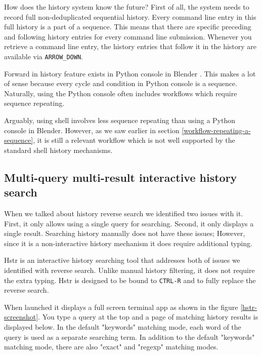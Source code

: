 How does the history system know the future? First of all, the system needs to record full non-deduplicated sequential history. Every command line entry in this full history is a part of a sequence. This means that there are specific preceding and following history entries for every command line submission. Whenever you retrieve a command line entry, the history entries that follow it in the history are available via \verb|ARROW_DOWN|.


Forward in history feature exists in Python console in Blender \cite{tools-blender-docs-python-console}. This makes a lot of sense because every cycle and condition in Python console is a sequence. Naturally, using the Python console often includes  workflows which require sequence repeating.

Arguably, using shell involves less sequence repeating than using a Python console in Blender. However, as we saw earlier in section \ref{workflow-repeating-a-sequence}, it is still a relevant workflow which is not well supported by the standard shell history mechanisms.  




\subsection{Multi-query multi-result interactive history search}

When we talked about history reverse search we identified two issues with it. First, it only allows using a single query for searching. Second, it only displays a single result.
Searching history manually does not have these issues; However, since it is a non-interactive history mechanism it does require additional typing. 

Hstr\cite{toolshstr} is an interactive history searching tool that addresses both of issues we identified with reverse search. Unlike manual history filtering, it does not require the extra typing. Hstr is designed to be bound to \verb|CTRL-R| and to fully replace the reverse search.

When launched it displays a full screen terminal app as shown in the figure \ref{hstr-screenshot}. You type a query at the top and a page of matching history results is displayed below. In the default "keywords" matching mode, each word of the query is used as a separate searching term. 
In addition to the default "keywords" matching mode, there are also "exact" and "regexp" matching modes. 

